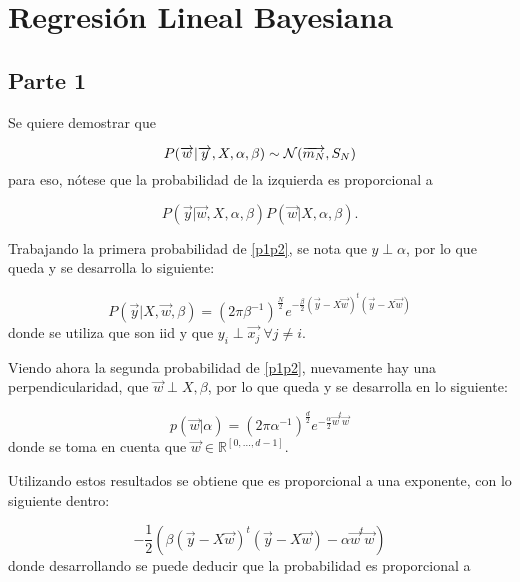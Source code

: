 \section{Regresión Lineal Bayesiana}
\subsection{Parte 1}

Se quiere demostrar que

\begin{equation}
\label{pdq}
    P(\overrightarrow{w}|\overrightarrow{y},X,\alpha,\beta) \sim \mathcal{N}(\overrightarrow{m_N}, S_N)
\end{equation}
para eso, nótese que la probabilidad de la izquierda es proporcional a

\begin{equation}
\label{p1p2}
    P(\overrightarrow{y}|\overrightarrow{w}, X, \alpha, \beta)P(\overrightarrow{w}|X,\alpha,\beta).
\end{equation}

Trabajando la primera probabilidad de \eqref{p1p2}, se nota que $y \perp \alpha$, por lo que queda y se desarrolla lo siguiente:

\begin{equation}
    P(\overrightarrow{y}|X,\overrightarrow{w}, \beta) = (2\pi\beta^{-1})^{\frac{N}{2}} e^{-\frac{\beta}{2}(\overrightarrow{y}-X\overrightarrow{w})^{t}(\overrightarrow{y}-X\overrightarrow{w})}
\end{equation}
donde se utiliza que son iid y que $y_i \perp \overrightarrow{x_j}\  \forall j \not= i$.

Viendo ahora la segunda probabilidad de \eqref{p1p2}, nuevamente hay una perpendicularidad, que $\overrightarrow{w} \perp X,\beta$, por lo que queda y se desarrolla en lo siguiente:

\begin{equation}
    p(\overrightarrow{w}|\alpha) = (2\pi \alpha^{-1})^{\frac{d}{2}} e^{-\frac{\alpha}{2}\overrightarrow{w}^t\overrightarrow{w}}
\end{equation}
donde se toma en cuenta que $\overrightarrow{w} \in \mathbb{R}^{[0,...,d-1]}$.

Utilizando estos resultados se obtiene que es proporcional a una exponente, con lo siguiente dentro:

\begin{equation}
    -\frac{1}{2}( \beta(\overrightarrow{y} - X\overrightarrow{w})^{t}(\overrightarrow{y} - X\overrightarrow{w})-\alpha \overrightarrow{w}^{t}\overrightarrow{w})
\end{equation}
donde desarrollando se puede deducir que la probabilidad es proporcional a

